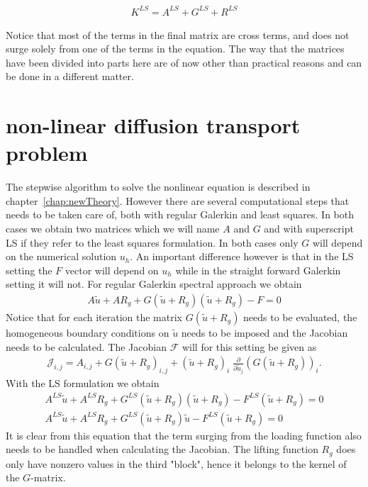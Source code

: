 \begin{align}
	K^{LS} = A^{LS} + G^{LS} + R^{LS}
	\label{eq:difftransMatrixSum}
\end{align}
%

Notice that most of the terms in the final matrix are cross terms, and does not surge solely from one of the terms in the equation. The way that the matrices have been divided into parts here are of now other than practical reasons and can be done in a different matter.  

\section{non-linear diffusion transport problem}
The stepwise algorithm to solve the nonlinear equation is described in chapter~\ref{chap:newTheory}. However there are several computational steps that needs to be taken care of, both with regular Galerkin and least squares. In both cases we obtain two matrices which we will name $A$ and $G$ and with superscript LS if they refer to the least squares formulation. In both cases only $G$ will depend on the numerical solution $u_h$. An important difference however is that in the LS setting the $F$ vector will depend on $u_h$ while in the straight forward Galerkin setting it will not. For regular Galerkin spectral approach we obtain
%
\begin{align}
	A \tilde{u} + AR_g  + G(\tilde{u}+R_g)(\tilde{u}+R_g) -F = 0
\end{align}
Notice that for each iteration the matrix $G(\tilde{u}+R_g)$ needs to be evaluated, the homogeneous boundary conditions on $\tilde{u}$ needs to be imposed and the Jacobian needs to be calculated. The Jacobian $\mathcal{F}$ will for this setting be given as
%
\begin{align}
	\mathcal{J}_{i,j} = A_{i,j} + G(\tilde{u}+R_g)_{i,j} +  (\tilde{u}+R_g)_i \; \frac{\partial}{\partial \tilde{u}_j} (G(\tilde{u}+R_g))_i.
\end{align}
%
With the LS formulation we obtain
\begin{align}
A^{LS}\tilde{u} + A^{LS}R_g  + G^{LS}(\tilde{u}+R_g)(\tilde{u}+R_g) -F^{LS}(\tilde{u}+R_g) = 0\\
A^{LS}\tilde{u} + A^{LS}R_g  + G^{LS}(\tilde{u}+R_g)\tilde{u} -F^{LS}(\tilde{u}+R_g) = 0
\end{align}
It is clear from this equation that the term surging from the loading function also needs to be handled when calculating the Jacobian. The lifting function $R_g$ does only have nonzero values in the third "block", hence it belongs to the kernel of the $G$-matrix.

